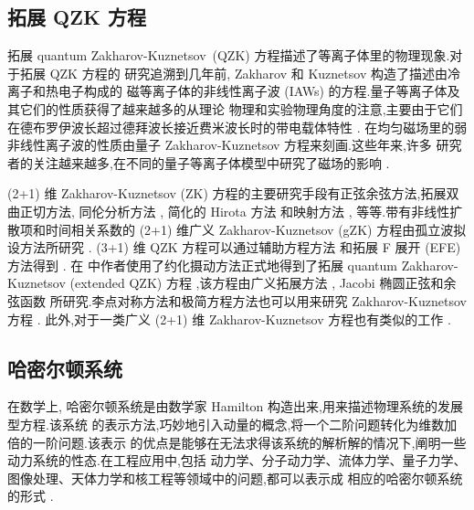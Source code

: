 \subsection{拓展 QZK 方程}

拓展 quantum Zakharov-Kuznetsov~(QZK) 方程描述了等离子体里的物理现象.对于拓展 QZK 方程的
研究追溯到几年前, Zakharov 和 Kuznetsov \cite{abdou2011quant} 构造了描述由冷离子和热电子构成的
磁等离子体的非线性离子波 (IAWs) 的方程.量子等离子体及其它们的性质获得了越来越多的从理论
物理和实验物理角度的注意,主要由于它们在德布罗伊波长超过德拜波长接近费米波长时的带电载体特性 \cite{abdou2011quant,ahmed2013kinks,bhrawy2013soli,biswas20091soli,biswas2013soli,bluman2010appli,elganaini2011tra,godleswski2004the,guner2015bright,ibragimov2006inte}. 在均匀磁场里的弱非线性离子波的性质由量子 Zakharov-Kuznetsov 方程来刻画.这些年来,许多
研究者的关注越来越多,在不同的量子等离子体模型中研究了磁场的影响 \cite{ibragimov2007anew,iwasaki1990cylin,johnpilai2011sym,khan2008linear,krishnan2010sol,leveque1992num,linares2009well,linares2011local,morris2013soli,moslem2007soli,mothibi2015con,moussa2001simi,munro2014con,munro2000sta,mushtaq2005non,olver2000app,peng2008exact,sabry2009non}.

(2+1) 维 Zakharov-Kuznetsov (ZK) 方程的主要研究手段有正弦余弦方法,拓展双曲正切方法,
同伦分析方法 \cite{linares2009well}, 简化的 Hirota 方法 \cite{biswas2013soli,bluman2010appli}
和映射方法 \cite{morris2013soli}, 等等.带有非线性扩散项和时间相关系数的 (2+1) 维广义
Zakharov-Kuznetsov (gZK) 方程由孤立波拟设方法所研究 \cite{sabry2009non}. (3+1) 维 QZK
方程可以通过辅助方程方法 \cite{ahmed2013kinks} 和拓展 F 展开 (EFE) 方法得到 \cite{munro2000sta}.
在 \cite{ahmed2013kinks} 中作者使用了约化摄动方法正式地得到了拓展 quantum Zakharov-Kuznetsov (extended QZK) 方程
,该方程由广义拓展方法 \cite{guner2015bright}, Jacobi 椭圆正弦和余弦函数 \cite{biswas20091soli}
所研究.李点对称方法和极简方程方法也可以用来研究 Zakharov-Kuznetsov 方程 \cite{leveque1992num}.
此外,对于一类广义 (2+1) 维 Zakharov-Kuznetsov 方程也有类似的工作 \cite{moslem2007soli}.

\subsection{哈密尔顿系统}

在数学上, 哈密尔顿系统是由数学家 Hamilton 构造出来,用来描述物理系统的发展型方程.该系统
的表示方法,巧妙地引入动量的概念,将一个二阶问题转化为维数加倍的一阶问题.该表示
的优点是能够在无法求得该系统的解析解的情况下,阐明一些动力系统的性态.在工程应用中,包括
动力学、分子动力学、流体力学、量子力学、图像处理、天体力学和核工程等领域中的问题,都可以表示成
相应的哈密尔顿系统的形式 \cite{arieh2009afirst}.

